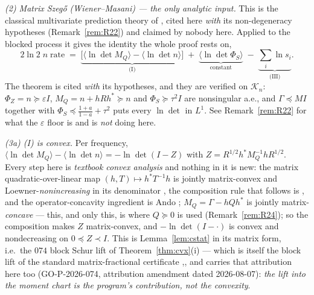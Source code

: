 \documentclass[11pt]{article}
\theoremstyle{definition}
\theoremstyle{remark}
\begin{document}
\emph{(2) Matrix Szeg\H o (Wiener--Masani) --- the only analytic
input.} This is the classical multivariate prediction theory of
\cite{bib:wm57,bib:wm58,bib:hl58}, cited here \emph{with} its
non-degeneracy hypotheses (Remark~\ref{rem:R22}) and claimed by
nobody here. Applied to the blocked process it gives the identity the
whole proof rests on,
\[
2\ln2\;n\;\mathrm{rate}
\;=\;\underbrace{\bigl[\langle\ln\det M_Q\rangle
-\langle\ln\det n\rangle\bigr]}_{\text{(I)}}
\;+\;\underbrace{\langle\ln\det\Phi_S\rangle}_{\text{constant}}
\;-\;\underbrace{\sum_i\ln s_i}_{\text{(III)}} .
\]
The theorem is cited \emph{with} its hypotheses, and they are verified
on $\mathcal K_n$: $\Phi_Z=n\succeq\varepsilon I$, $M_Q=n+hRh^\ast
\succeq n$ and $\Phi_S\succeq\tau^2I$ are nonsingular a.e., and
$\Gamma\preceq MI$ together with $\Phi_S\preceq
\frac{1+a}{1-a}+\tau^2$ puts every $\ln\det$ in $L^1$. See
Remark~\ref{rem:R22} for what the $\varepsilon$ floor is and is
\emph{not} doing here.

\emph{(3a) (I) is convex.} Per frequency,
$\langle\ln\det M_Q\rangle-\langle\ln\det n\rangle
=-\ln\det(I-Z)$ with $Z=R^{1/2}h^\ast M_Q^{-1}hR^{1/2}$. Every step
here is \emph{textbook convex analysis} and nothing in it is new: the
matrix quadratic-over-linear map $(h,T)\mapsto h^\ast T^{-1}h$ is
jointly matrix-convex and Loewner-\emph{nonincreasing} in its
denominator \cite[Sec.~3.1.7]{bib:bv04}, the composition rule that
follows is \cite[Sec.~3.2.4]{bib:bv04}, and the operator-concavity
ingredient is Ando \cite{bib:ando79};
$M_Q=\Gamma-hQh^\ast$ is jointly matrix-\emph{concave} --- this, and
only this, is where $Q\succeq0$ is used (Remark~\ref{rem:R24}); so the
composition makes $Z$ matrix-convex, and $-\ln\det(I-\cdot)$ is convex
and nondecreasing on $0\preceq Z\prec I$. This is
Lemma~\ref{lem:cstat} in its matrix form, i.e.\ the $074$ block Schur
lift of Theorem~\ref{thm:cvx}(i) --- which is itself the block lift of
the standard matrix-fractional certificate
\cite[Sec.~3.1.7 and 3.2.4]{bib:bv04},\cite{bib:ando79}, and carries
that attribution here too (GO-P-2026-074, attribution amendment dated
2026-08-07): \emph{the lift into the moment chart is the program's
contribution, not the convexity}.
\end{document}
